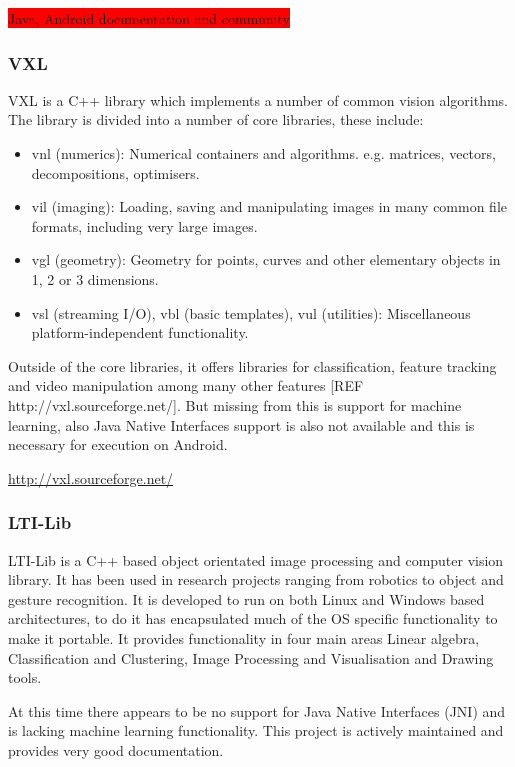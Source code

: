 \colorbox{red}{Java, Android documentation and community}

\subsubsection{VXL}
VXL is a C++ library which implements a number of common vision algorithms. The library is divided into a number of core libraries, these include: 

\begin{itemize}
\item vnl (numerics): Numerical containers and algorithms. e.g. matrices, vectors, decompositions, optimisers.
\item vil (imaging): Loading, saving and manipulating images in many common file formats, including very large images.
\item vgl (geometry): Geometry for points, curves and other elementary objects in 1, 2 or 3 dimensions.
\item vsl (streaming I/O), vbl (basic templates), vul (utilities): Miscellaneous platform-independent functionality.
\end{itemize}

Outside of the core libraries, it offers libraries for classification, feature tracking and video manipulation among many other features [REF http://vxl.sourceforge.net/]. But missing from this is support for machine learning, also Java Native Interfaces support is also not available and this is necessary for execution on Android.

\url{http://vxl.sourceforge.net/}


\subsubsection{LTI-Lib}
LTI-Lib is a C++ based object orientated image processing and computer vision library. It has been used in research projects ranging from robotics to object and gesture recognition. It is developed to run on both Linux and Windows based architectures, to do it has encapsulated much of the OS specific functionality to make it portable. It provides functionality in four main areas Linear algebra, Classification and Clustering, Image Processing and Visualisation and Drawing tools.

At this time there appears to be no support for Java Native Interfaces (JNI) and is lacking machine learning functionality. This project is actively maintained and provides very good documentation.
 
